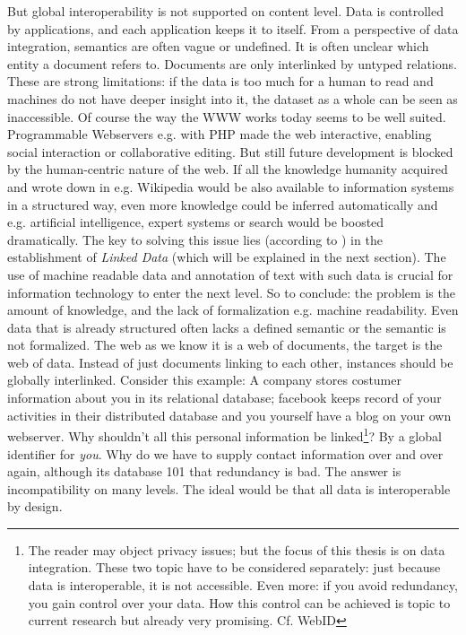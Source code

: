 But global interoperability is not supported on content level. 
Data is controlled by applications, and each application keeps it to itself.
From a perspective of data integration, semantics are often vague or undefined. 
It is often unclear which entity a document refers to. 
Documents are only interlinked by untyped relations. 
These are strong limitations: if the data is too much for a human to read and machines do not have deeper insight into it, the dataset as a whole can be seen as inaccessible. 
Of course the way the WWW works today seems to be well suited. 
Programmable Webservers e.g. with PHP made the web interactive, enabling social interaction or collaborative editing. But still future development is blocked by the human-centric nature of the web. 
If all the knowledge humanity acquired and wrote down in e.g. Wikipedia would be also available to information systems in a structured way, even more knowledge could be inferred automatically and e.g. artificial intelligence, expert systems or search would be boosted dramatically. 
The key to solving this issue lies (according to \cite{berners}) in the establishment of \textit{Linked Data} (which will be explained in the next section). 
The use of machine readable data and annotation of text with such data is crucial for information technology to enter the next level.
So to conclude: the problem is the amount of knowledge, and the lack of formalization e.g. machine readability. 
Even data that is already structured often lacks a defined semantic or the semantic is not formalized. 
The web as we know it is a web of documents, the target is the web of data. 
Instead of just documents linking to each other, instances should be globally interlinked. 
Consider this example: A company stores costumer information about you in its relational database; facebook keeps record of your activities in their distributed database and you yourself have a blog on your own webserver. 
Why shouldn't all this personal information be linked\footnote{The reader may object privacy issues; but the focus of this thesis is on data integration. These two topic have to be considered separately: just because data is interoperable, it is not accessible. 
Even more: if you avoid redundancy, you gain control over your data. 
How this control can be achieved is topic to current research but already very promising. Cf. WebID}? By a global identifier for \textit{you}. 
Why do we have to supply contact information over and over again, although its database 101 that redundancy is bad. 
The answer is incompatibility on many levels. The ideal would be that all data is interoperable by design. 
